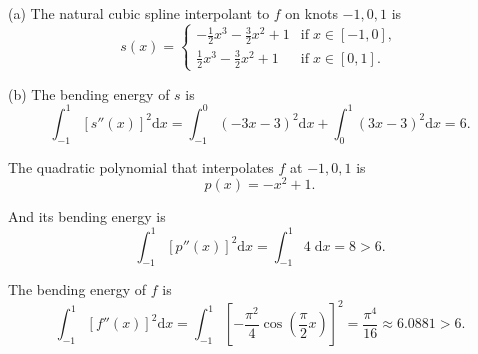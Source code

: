 \documentclass[11pt]{elegantbook}
\begin{document}
\begin{solution}
  (a) The natural cubic spline interpolant to $f$ on knots $-1,0,1$ is
  \begin{equation*}
    s(x)=\left\{
      \begin{array}{ll}
        -\frac{1}{2}x^3-\frac{3}{2}x^2+1 & \text{if}\; x\in[-1,0],\\
        \frac{1}{2}x^3-\frac{3}{2}x^2+1 & \text{if}\; x\in[0,1].
      \end{array}
    \right.
  \end{equation*}

  (b) The bending energy of $s$ is
  \begin{equation*}
    \int_{-1}^1 [s''(x)]^2 \text{d}x = \int_{-1}^0 (-3x-3)^2 \text{d}x + \int_{0}^1 (3x-3)^2 \text{d}x=6.
  \end{equation*}
  
  The quadratic polynomial that interpolates $f$ at $-1,0,1$ is
  \begin{equation*}
    p(x)=-x^2+1.
  \end{equation*}

  And its bending energy is
  \begin{equation*}
    \int_{-1}^1 [p''(x)]^2 \text{d} x = \int_{-1}^1 4 \;\text{d} x = 8 > 6.
  \end{equation*}

  The bending energy of $f$ is
  \begin{equation*}
    \int_{-1}^1 [f''(x)]^2 \text{d} x = \int_{-1}^1 \left[-\frac{\pi^2}{4}\cos\left(\frac{\pi}{2}x\right)\right]^2 = \frac{\pi^4}{16} \approx 6.0881 > 6.
  \end{equation*}
\end{solution}
\end{document}
